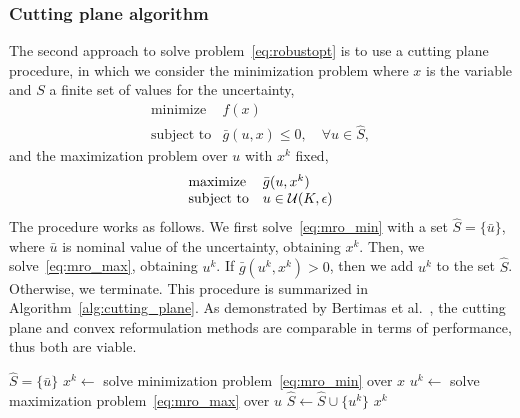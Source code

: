 \documentclass[12pt]{article}
\theoremstyle{thmstyleone}%
\theoremstyle{thmstyletwo}%
\theoremstyle{thmstylethree}%
\begin{document}
\subsubsection{Cutting plane algorithm}
The second approach to solve problem~\eqref{eq:robustopt} is to use a cutting plane procedure, in which we consider the minimization problem where $x$ is the variable and $S$ a finite set of values for the uncertainty,
\begin{equation}
	\label{eq:mro_min}
	\begin{array}{ll}
		\mbox{minimize} & f(x)\\
		\mbox{subject to} & \bar{g}(u, x)  \le 0, \quad \forall u \in
		\hat{S},
		\end{array}
\end{equation}
and the maximization problem over $u$ with $x^k$ fixed,
\begin{equation}
	\label{eq:mro_max}
	\begin{array}{ll}
		\mbox{maximize} & \bar{g}(u, x^k)\\
		\mbox{subject to} & u \in {\mathcal{U}}(K, \epsilon)
	\end{array}
\end{equation}
The procedure works as follows.
We first solve~\eqref{eq:mro_min} with a set $\hat{S} = \{\bar{u}\}$, where $\bar{u}$ is nominal value of the uncertainty, obtaining $x^k$.
Then, we solve~\eqref{eq:mro_max}, obtaining $u^k$.
If $\bar{g}(u^k, x^k) > 0$, then we add $u^k$ to the set $\hat{S}$.
Otherwise, we terminate. This procedure is summarized in Algorithm~\ref{alg:cutting_plane}.
As demonstrated by Bertimas et al.~\cite{cuttingplane}, the cutting plane and convex reformulation methods are comparable in terms of performance, thus both are viable.
\begin{algorithm}
	\caption{Cutting plane algorithm to solve~\eqref{eq:robustopt}}
	\label{alg:cutting_plane}
	\begin{algorithmic}[1]
	  $\hat{S} = \{\bar{u}\}$
	 \State $x^k \gets $ solve minimization problem~\eqref{eq:mro_min} over $x$
	 \State $u^k \gets $ solve maximization problem~\eqref{eq:mro_max} over $u$
	 \State $\hat{S} \gets \hat{S} \cup \{u^k\}$
	 \Else
	  $x^k$
	 \EndIf
	 \EndFor
	\end{algorithmic}
\end{algorithm}
\end{document}
